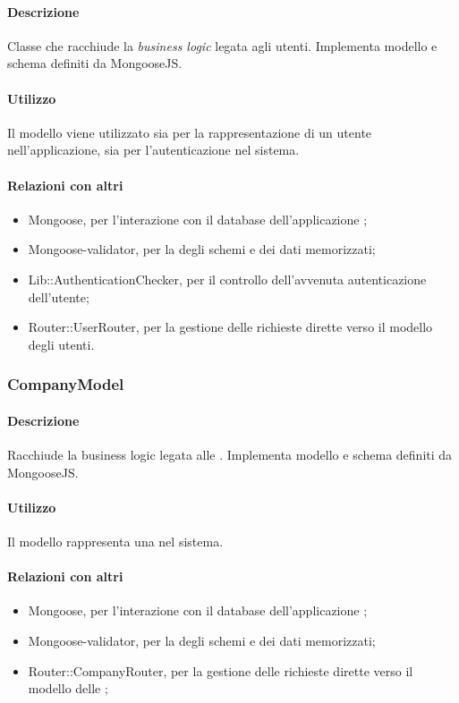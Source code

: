 \paragraph*{Descrizione}
Classe che racchiude la \textit{business logic} legata agli utenti. Implementa modello e schema definiti da MongooseJS.

\paragraph*{Utilizzo}
Il modello viene utilizzato sia per la rappresentazione di un utente nell'applicazione, sia per l'autenticazione nel sistema.

\paragraph*{Relazioni con altri }
\begin{itemize}
\item Mongoose, per l'interazione con il database  dell'applicazione ;
\item Mongoose-validator, per la  degli schemi e dei dati memorizzati;
\item Lib::AuthenticationChecker, per il controllo dell'avvenuta autenticazione dell'utente;
\item Router::UserRouter, per la gestione delle richieste dirette verso il modello degli utenti.
\end{itemize}

\subsubsection{CompanyModel}
\paragraph*{Descrizione}
Racchiude la business logic legata alle . Implementa modello e schema definiti da MongooseJS.

\paragraph*{Utilizzo}
Il modello rappresenta una  nel sistema.

\paragraph*{Relazioni con altri }
\begin{itemize}
\item Mongoose, per l'interazione con il database  dell'applicazione ;
\item Mongoose-validator, per la  degli schemi e dei dati memorizzati;
\item Router::CompanyRouter, per la gestione delle richieste dirette verso il modello delle ;
\end{itemize}

